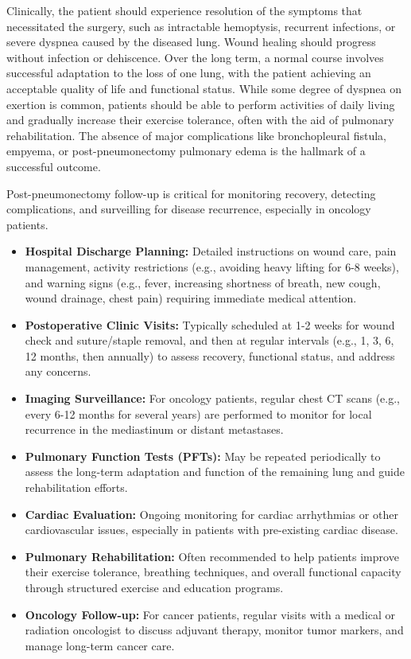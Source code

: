 Clinically, the patient should experience resolution of the symptoms that necessitated the surgery, such as intractable hemoptysis, recurrent infections, or severe dyspnea caused by the diseased lung. Wound healing should progress without infection or dehiscence. Over the long term, a normal course involves successful adaptation to the loss of one lung, with the patient achieving an acceptable quality of life and functional status. While some degree of dyspnea on exertion is common, patients should be able to perform activities of daily living and gradually increase their exercise tolerance, often with the aid of pulmonary rehabilitation. The absence of major complications like bronchopleural fistula, empyema, or post-pneumonectomy pulmonary edema is the hallmark of a successful outcome.

Post-pneumonectomy follow-up is critical for monitoring recovery, detecting complications, and surveilling for disease recurrence, especially in oncology patients.

\begin{itemize}
  \item \textbf{Hospital Discharge Planning:} Detailed instructions on wound care, pain management, activity restrictions (e.g., avoiding heavy lifting for 6-8 weeks), and warning signs (e.g., fever, increasing shortness of breath, new cough, wound drainage, chest pain) requiring immediate medical attention.
  
  \item \textbf{Postoperative Clinic Visits:} Typically scheduled at 1-2 weeks for wound check and suture/staple removal, and then at regular intervals (e.g., 1, 3, 6, 12 months, then annually) to assess recovery, functional status, and address any concerns.
  
  \item \textbf{Imaging Surveillance:} For oncology patients, regular chest CT scans (e.g., every 6-12 months for several years) are performed to monitor for local recurrence in the mediastinum or distant metastases.
  
  \item \textbf{Pulmonary Function Tests (PFTs):} May be repeated periodically to assess the long-term adaptation and function of the remaining lung and guide rehabilitation efforts.
  
  \item \textbf{Cardiac Evaluation:} Ongoing monitoring for cardiac arrhythmias or other cardiovascular issues, especially in patients with pre-existing cardiac disease.
  
  \item \textbf{Pulmonary Rehabilitation:} Often recommended to help patients improve their exercise tolerance, breathing techniques, and overall functional capacity through structured exercise and education programs.
  
  \item \textbf{Oncology Follow-up:} For cancer patients, regular visits with a medical or radiation oncologist to discuss adjuvant therapy, monitor tumor markers, and manage long-term cancer care.
\end{itemize}

